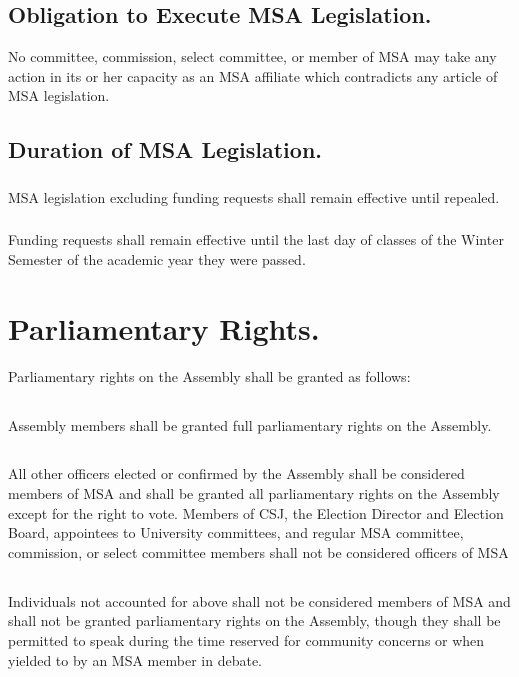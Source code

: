 \subsection{Obligation to Execute MSA Legislation.}  No committee, commission, select committee, or member of MSA may take any action in its or her capacity as an MSA affiliate which contradicts any article of MSA legislation.

\subsection{Duration of MSA Legislation.} 

\subsubsection{}
MSA legislation excluding funding requests shall remain effective until repealed.
\subsubsection{}
Funding requests shall remain effective until the last day of classes of the Winter Semester of the academic year they were passed.


\section{Parliamentary Rights.}
Parliamentary rights on the Assembly shall be granted as follows:

\subsection{}
Assembly members shall be granted full parliamentary rights on the Assembly.

\subsection{}
All other officers elected or confirmed by the Assembly shall be considered members of MSA and shall be granted all parliamentary rights on the Assembly except for the right to vote. Members of CSJ, the Election Director and Election Board, appointees to University committees, and regular MSA committee, commission, or select committee members shall not be considered officers of MSA

\subsection{}
Individuals not accounted for above shall not be considered members of MSA and shall not be granted parliamentary rights on the Assembly, though they shall be permitted to speak during the time reserved for community concerns or when yielded to by an MSA member in debate.
